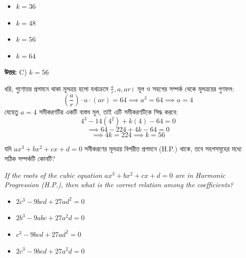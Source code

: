 \documentclass[12pt, a4paper]{article}
\begin{document}
\begin{itemize}[label={}, leftmargin=1cm, itemsep=0.5em]
    \item[\textbf{A)}] $k = 36$
    \item[\textbf{B)}] $k = 48$
    \item[\textbf{C)}] $k = 56$
    \item[\textbf{D)}] $k = 64$
\end{itemize}

\vspace{0.5em}
\begin{tcolorbox}[answerbox]
    \textbf{\color{success} উত্তর:} C) $k = 56$
\end{tcolorbox}
\vspace{1em}

\begin{tcolorbox}[solutionbox={সমাধান (Solution)}]
    \noindent
    ধরি, গুণোত্তর প্রগমনে থাকা মূলত্রয় হলো যথাক্রমে $\frac{a}{r}, a, ar$। 
    মূল ও সহগের সম্পর্ক থেকে মূলত্রয়ের গুণফল:
    \[ \left(\frac{a}{r}\right) \cdot a \cdot (ar) = 64 \implies a^3 = 64 \implies a = 4 \]
    যেহেতু $a = 4$ সমীকরণটির একটি বাস্তব মূল, তাই এটি সমীকরণটিকে সিদ্ধ করবে:
    \[ 4^3 - 14(4^2) + k(4) - 64 = 0 \]
    \[ \implies 64 - 224 + 4k - 64 = 0 \]
    \[ \implies 4k = 224 \implies k = 56 \]
\end{tcolorbox}
\begin{tcolorbox}[questionbox={প্রশ্ন (Question) 45}]
    \noindent
    যদি $ax^3 + bx^2 + cx + d = 0$ সমীকরণের মূলত্রয় বিপরীত প্রগমনে (H.P.) থাকে, তবে সহগসমূহের মধ্যে সঠিক সম্পর্কটি কোনটি?
    
    \vspace{0.8em}
    \begin{english}
    \noindent\textit{\color{darkgray}
    If the roots of the cubic equation $ax^3 + bx^2 + cx + d = 0$ are in Harmonic Progression (H.P.), then what is the correct relation among the coefficients?
    }
    \end{english}
\end{tcolorbox}

\begin{itemize}[label={}, leftmargin=1cm, itemsep=0.5em]
    \item[\textbf{A)}] $2c^3 - 9bcd + 27ad^2 = 0$
    \item[\textbf{B)}] $2b^3 - 9abc + 27a^2 d = 0$
    \item[\textbf{C)}] $c^3 - 9bcd + 27ad^2 = 0$
    \item[\textbf{D)}] $2c^3 - 9bcd + 27a^2 d = 0$
\end{itemize}
\end{document}
